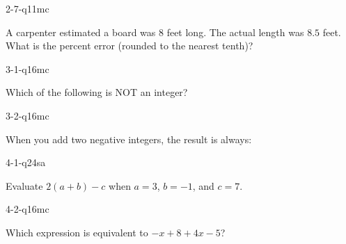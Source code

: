 \begin{practiceQuestion}{2-7-q11}{mc}
\begin{questionText}
A carpenter estimated a board was $8$ feet long. The actual length was $8.5$ feet. What is the percent error (rounded to the nearest tenth)?
\end{questionText}
\end{practiceQuestion}

\begin{practiceQuestion}{3-1-q16}{mc}
\begin{questionText}
Which of the following is NOT an integer?
\end{questionText}
\end{practiceQuestion}

\begin{practiceQuestion}{3-2-q16}{mc}
\begin{questionText}
When you add two negative integers, the result is always:
\end{questionText}
\end{practiceQuestion}

\begin{practiceQuestion}{4-1-q24}{sa}
\begin{questionText}
Evaluate $2(a + b) - c$ when $a = 3$, $b = -1$, and $c = 7$.
\end{questionText}
\end{practiceQuestion}

\begin{practiceQuestion}{4-2-q16}{mc}
\begin{questionText}
Which expression is equivalent to $-x + 8 + 4x - 5$?
\end{questionText}
\end{practiceQuestion}

